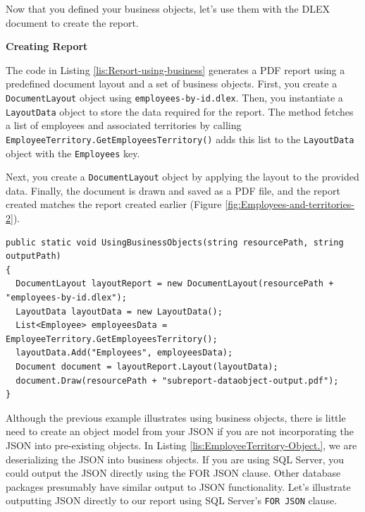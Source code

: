 \documentclass[american,letterpaper]{tufte-book}
\numberwithin{equation}{section}
\numberwithin{figure}{section}
\begin{document}
{{Now that you defined your business objects, let's use them with the
DLEX document to create the report.
\noindent\begin{flushleft}
\textbf{Creating Report}
\par\end{flushleft}

The code in Listing \ref{lis:Report-using-business} generates a PDF
report using a predefined document layout and a set of business objects.
First, you create a \texttt{DocumentLayout} object using \texttt{employees-by-id.dlex}.
Then, you instantiate a \texttt{LayoutData} object to store the data
required for the report. The method fetches a list of employees and
associated territories by calling \texttt{EmployeeTerritory.GetEmployeesTerritory()}
adds this list to the \texttt{LayoutData} object with the \texttt{Employees}
key.

Next, you create a \texttt{DocumentLayout} object by applying the
layout to the provided data. Finally, the document is drawn and saved
as a PDF file, and the report created matches the report created earlier
(Figure \ref{fig:Employees-and-territories-2}).

\bgroup{}
\begin{lstlisting}[caption={Report using business object.},label={lis:Report-using-business},basicstyle={\small\ttfamily},breaklines=true]
public static void UsingBusinessObjects(string resourcePath, string outputPath)
{
  DocumentLayout layoutReport = new DocumentLayout(resourcePath + "employees-by-id.dlex");
  LayoutData layoutData = new LayoutData();
  List<Employee> employeesData = EmployeeTerritory.GetEmployeesTerritory();
  layoutData.Add("Employees", employeesData);
  Document document = layoutReport.Layout(layoutData);
  document.Draw(resourcePath + "subreport-dataobject-output.pdf");
}
\end{lstlisting}
\leavevmode\egroup

Although the previous example illustrates using business objects,
there is little need to create an object model from your JSON if you
are not incorporating the JSON into pre-existing objects. In Listing
\ref{lis:EmployeeTerritory-Object.}, we are deserializing the JSON
into business objects. If you are using SQL Server, you could output
the JSON directly using the FOR JSON clause. Other database packages
presumably have similar output to JSON functionality. Let's illustrate
outputting JSON directly to our report using SQL Server's \texttt{FOR
JSON} clause.

}}
\end{document}

